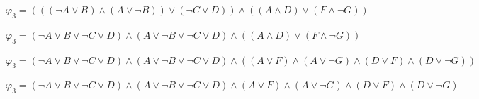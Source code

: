 \documentclass{article}
\begin{document}
$\varphi_3 = (((\neg A \vee B) \wedge (A \vee \neg B) ) \vee (\neg C \vee D)) \wedge ((A \wedge D) \vee (F \wedge \neg G))$

$\varphi_3 = (\neg A \vee B \vee \neg C \vee D) \wedge (A \vee \neg B \vee \neg C \vee D)
\wedge ((A \wedge D) \vee (F \wedge \neg G))$

$\varphi_3 = (\neg A \vee B \vee \neg C \vee D) \wedge (A \vee \neg B \vee \neg C \vee D)
\wedge ((A \vee F) \wedge (A \vee \neg G) \wedge (D \vee F) \wedge (D \vee \neg G))$

$\varphi_3 = (\neg A \vee B \vee \neg C \vee D) \wedge (A \vee \neg B \vee \neg C \vee D)
\wedge (A \vee F) \wedge (A \vee \neg G) \wedge (D \vee F) \wedge (D \vee \neg G)$
\end{document}
